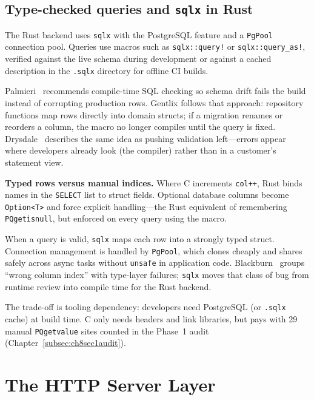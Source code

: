 \subsection{Type-checked queries and \texorpdfstring{\texttt{sqlx}}{sqlx} in Rust}
\label{subsec:ch6sec1-2}

\par The Rust backend uses \texttt{sqlx} with the PostgreSQL feature and a \texttt{PgPool} 
connection pool. Queries use macros such as \texttt{sqlx::query!} or \texttt{sqlx::query\_as!}, 
verified against the live schema during development or against a cached description in the 
\texttt{.sqlx} directory for offline CI builds.

\par Palmieri~\cite{Palmieri2022} recommends compile-time SQL checking so schema drift fails 
the build instead of corrupting production rows. Gentlix follows that approach: repository 
functions map rows directly into domain structs; if a migration renames or reorders a column, 
the macro no longer compiles until the query is fixed. Drysdale~\cite{Drysdale2024} describes 
the same idea as pushing validation left---errors appear where developers already look 
(the compiler) rather than in a customer's statement view.

\par \textbf{Typed rows versus manual indices.} Where C increments \texttt{col++}, Rust 
binds names in the \texttt{SELECT} list to struct fields. Optional database columns become 
\texttt{Option<T>} and force explicit handling---the Rust equivalent of remembering 
\texttt{PQgetisnull}, but enforced on every query using the macro.

\par When a query is valid, \texttt{sqlx} maps each row into a strongly typed struct. 
Connection management is handled by \texttt{PgPool}, which clones cheaply and shares safely 
across async tasks without \texttt{unsafe} in application code. Blackburn~\cite{Blackburn2025} 
groups ``wrong column index'' with type-layer failures; \texttt{sqlx} moves that class of bug 
from runtime review into compile time for the Rust backend.

\par The trade-off is tooling dependency: developers need PostgreSQL (or \texttt{.sqlx} cache) 
at build time. C only needs headers and link libraries, but pays with 29 manual 
\texttt{PQgetvalue} sites counted in the Phase~1 audit (Chapter~\ref{subsec:ch8sec1audit}).

\section{The HTTP Server Layer}
\label{sec:ch6sec2}

